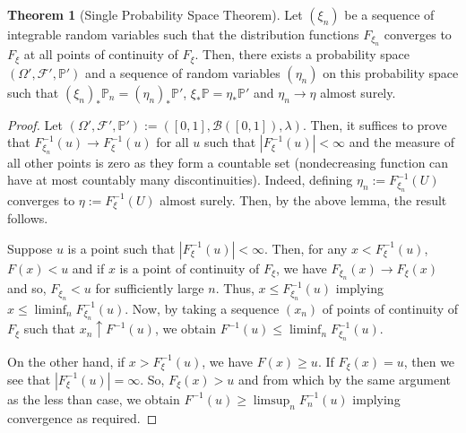 \documentclass[]{article}
\theoremstyle{definition}
\newtheorem{theorem}{Theorem}
\theoremstyle{definition}
\begin{document}
\begin{theorem}[Single Probability Space Theorem]
  Let \((\xi_n)\) be a sequence of integrable random variables such that the 
  distribution functions \(F_{\xi_n}\) converges to \(F_\xi\) at all 
  points of continuity of \(F_\xi\). Then, there exists a probability space 
  \((\Omega', \mathcal{F}', \mathbb{P}')\) and a sequence of random variables 
  \((\eta_n)\) on this probability space such that 
  \((\xi_n)_*\mathbb{P}_n = (\eta_n)_*\mathbb{P}'\), 
  \(\xi_*\mathbb{P} = \eta_* \mathbb{P}'\) and \(\eta_n \to \eta\) 
  almost surely.
\end{theorem}
\begin{proof}
  Let \((\Omega', \mathcal{F}', \mathbb{P}') := ([0, 1], \mathcal{B}([0, 1]), \lambda)\).
  Then, it suffices to prove that \(F_{\xi_n}^{-1}(u) \to F_\xi^{-1}(u)\) for all 
  \(u\) such that \(|F_\xi^{-1}(u)| < \infty\) and the measure of all other points 
  is zero as they form a countable set (nondecreasing function can have at most 
  countably many discontinuities). Indeed, defining \(\eta_n := F_{\xi_n}^{-1}(U)\) 
  converges to \(\eta := F_\xi^{-1}(U)\) almost surely. Then, by the above lemma, 
  the result follows. 

  Suppose \(u\) is a point such that \(|F_\xi^{-1}(u)| < \infty\). Then, for any 
  \(x < F_\xi^{-1}(u)\), \(F(x) < u\) and if \(x\) is a point of continuity 
  of \(F_\xi\), we have \(F_{\xi_n}(x) \to F_\xi(x)\) and so, \(F_{\xi_n}< u\) 
  for sufficiently large \(n\). Thus, \(x \le F_{\xi_n}^{-1}(u)\) implying 
  \(x \le \liminf_n F_{\xi_n}^{-1}(u)\). Now, by taking a sequence \((x_n)\) 
  of points of continuity of \(F_\xi\) such that \(x_n \uparrow F^{-1}(u)\), 
  we obtain \(F^{-1}(u) \le \liminf_n F_{\xi_n}^{-1}(u)\).

  On the other hand, if \(x > F_\xi^{-1}(u)\), we have \(F(x) \ge u\). 
  If \(F_\xi(x) = u\), then we see that \(|F_{\xi}^{-1}(u)| = \infty\). 
  So, \(F_\xi(x) > u\) and from which by the same argument as the less 
  than case, we obtain \(F^{-1}(u) \ge \limsup_n F_n^{-1}(u)\) implying 
  convergence as required.
\end{proof}
\end{document}
